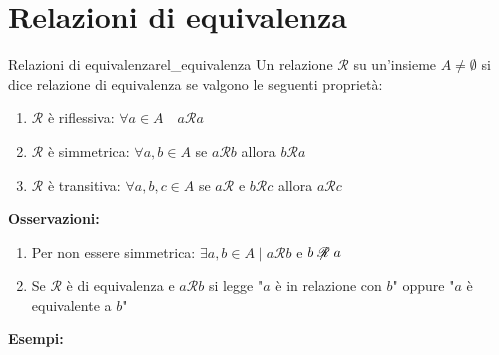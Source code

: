 \documentclass[12pt, letterpaper]{report}
\newcounter{definition}
\newcommand{\nmu}{}
\begin{document}
		\section{Relazioni di equivalenza}
		 \begin{definition}{\nmu Relazioni di equivalenza}{rel_equivalenza}
			Un relazione $\mathscr{R}$ su un'insieme $A \neq \emptyset$ si dice relazione di equivalenza se valgono le seguenti proprietà:
			\begin{enumerate}
				\item $\mathscr{R}$ è riflessiva: $\forall a \in A \quad a \mathscr{R} a$
				\item $\mathscr{R}$ è simmetrica: $\forall a,b \in A$ se $a \mathscr{R} b$ allora $b \mathscr{R} a$
				\item $\mathscr{R}$ è transitiva: $\forall a,b,c \in A$ se $a \mathscr{R}$ e $b \mathscr{R} c$ allora $a \mathscr{R} c$
			\end{enumerate}
		\end{definition}
		\textbf{Osservazioni:}
		\begin{enumerate}
			\item Per non essere simmetrica: $\exists a,b \in A \mid a \mathscr{R} b$ e $b \centernot{\mathscr{R}} a$
			\item Se $\mathscr{R}$ è di equivalenza e $a \mathscr{R} b$ si legge "$a$ è in relazione con $b$" oppure "$a$ è equivalente a $b$"
		\end{enumerate}
		\textbf{Esempi:}
\end{document}
